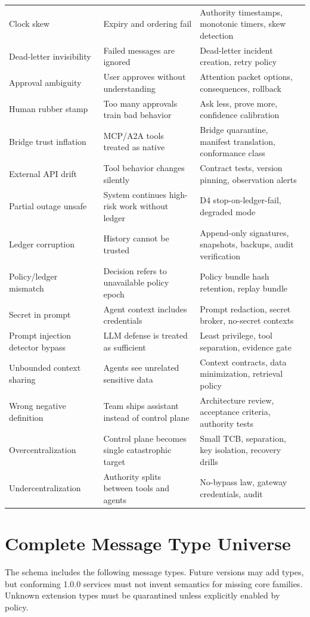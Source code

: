 \documentclass[journal,onecolumn]{IEEEtran}
\begin{document}
\begin{longtable}{p{}p{}p{}}
Clock skew & Expiry and ordering fail & Authority timestamps, monotonic timers, skew detection\\
Dead-letter invisibility & Failed messages are ignored & Dead-letter incident creation, retry policy\\
Approval ambiguity & User approves without understanding & Attention packet options, consequences, rollback\\
Human rubber stamp & Too many approvals train bad behavior & Ask less, prove more, confidence calibration\\
Bridge trust inflation & MCP/A2A tools treated as native & Bridge quarantine, manifest translation, conformance class\\
External API drift & Tool behavior changes silently & Contract tests, version pinning, observation alerts\\
Partial outage unsafe & System continues high-risk work without ledger & D4 stop-on-ledger-fail, degraded mode\\
Ledger corruption & History cannot be trusted & Append-only signatures, snapshots, backups, audit verification\\
Policy/ledger mismatch & Decision refers to unavailable policy epoch & Policy bundle hash retention, replay bundle\\
Secret in prompt & Agent context includes credentials & Prompt redaction, secret broker, no-secret contexts\\
Prompt injection detector bypass & LLM defense is treated as sufficient & Least privilege, tool separation, evidence gate\\
Unbounded context sharing & Agents see unrelated sensitive data & Context contracts, data minimization, retrieval policy\\
Wrong negative definition & Team ships assistant instead of control plane & Architecture review, acceptance criteria, authority tests\\
Overcentralization & Control plane becomes single catastrophic target & Small TCB, separation, key isolation, recovery drills\\
Undercentralization & Authority splits between tools and agents & No-bypass law, gateway credentials, audit\\
\bottomrule
\end{longtable}

\section{Complete Message Type Universe}
The schema includes the following message types. Future versions may add types, but conforming 1.0.0 services must not invent semantics for missing core families. Unknown extension types must be quarantined unless explicitly enabled by policy.
\end{document}
